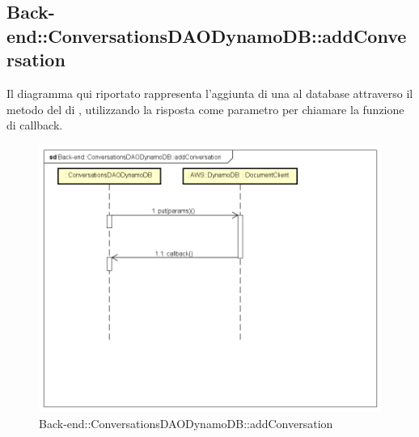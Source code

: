 \subsection{Back-end::ConversationsDAODynamoDB::addConversation}
Il diagramma qui riportato rappresenta l'aggiunta di una  al database attraverso il metodo  del  di , utilizzando la risposta come parametro per chiamare la funzione di callback.
 \begin{figure}[h] \centering \includegraphics[width=\textwidth,height=\textheight,keepaspectratio]{images/diagrams/back-end/Ufficial_Backend/Back-endConversationsDAODynamoDBaddConversation.png} 	\caption{Back-end::ConversationsDAODynamoDB::addConversation}
\end{figure}
\newpage

